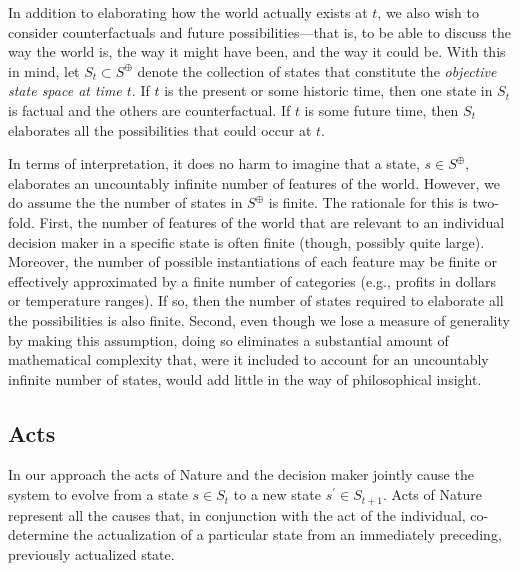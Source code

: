 \documentclass[
11pt,
titlepage,
reqno,
]{article}%
\theoremstyle{definition}
\begin{document}
In addition to elaborating how the world actually exists at $t$, we also wish to consider counterfactuals and future possibilities---that is, to be able to discuss the way the world is, the way it might have been, and the way it could be.
With this in mind, let $S_t\subset S^\oplus$ denote the collection of states that constitute the \textit{objective state space at time $t$}. 
If $t$ is the present or some historic time, then one state in  $S_t$ is factual and the others are counterfactual. 
If $t$ is some future time, then $S_t$ elaborates all the possibilities that could occur at $t$.

In terms of interpretation, it does no harm to imagine that a state, $s\in S^\oplus$, elaborates an uncountably infinite number of features of the world.
However,  we do assume the the number of states in $S^\oplus$ is finite.
The rationale for this is two-fold.
First, the number of features of the world that are relevant to an individual decision maker in a specific state is often finite (though, possibly quite large).
Moreover, the number of possible instantiations of each feature may be finite or effectively approximated by a finite number of  categories (e.g., profits in dollars or temperature ranges).
If so, then the number of states required to elaborate all the possibilities is also finite.
Second, even  though we lose a measure of generality by making this assumption, doing so eliminates a substantial amount of mathematical complexity that, were it included to account for an uncountably infinite number of states, would add little in the way of philosophical insight.

	
	
	
\subsection{Acts}\label{sec:acts}
	
In our approach the acts of Nature and the decision maker jointly cause the system to evolve from a state $s\in S_t$ to a new state $s^\prime\in S_{t+1}$.
Acts of Nature represent all the causes that, in conjunction with the act of the individual, co-determine the actualization of a particular state from an immediately preceding, previously actualized state.
	
\end{document}
